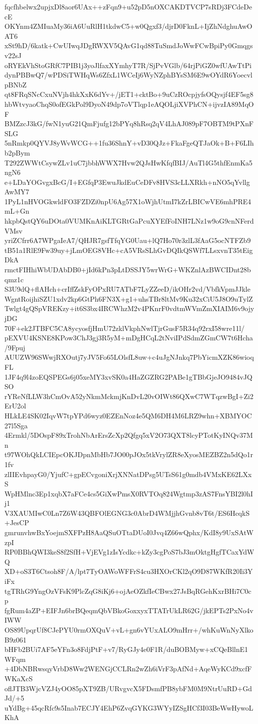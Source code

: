 fqcfhbelwx2upjxDl8aor6UAx++zFqn9+u52pD5nOXCAKDTVCP7sRDj3FCdeDecE
OKYnm4ZMIuaMy36iA6UuRlH1tkdwC5+w0Qgxf3/djrD0FknL+IjZhNdghuAwOAT6
xSt9hD/6katk+CwUIwqJDgRWXV5QAvG1qd88TuSmdJoWwFCwBpiPy0Gmqgsv22sJ
oRYEkVhStoGRfC7PIB1j3yoJlfaxXYmhyT7R/SjPvVGlb/64rjPiGZ0wfUAwTtPi
dynPBBwQ7/wPDSiTWHqWs6ZfxL1WCeIj6WyNZphBYsSM6E9wOYdR6YoecvlpBNbZ
qt8FRqSNcCxuNVjh4hkXxK6dYv+/jET1+cktBo+9uCzROcpjyfsOQysjf4EF5sg8
hbWtvyaoChqS0ofEGkPol9DyoN49dp7oVTlqp1eAQOLjiXVPhCN+ijvzIA89MqOF
BMZzcJ3kG/fwN1yuG21QmFjufg12bPYq8hRsq2qV4LhAJ089pF7OBTM9tPXnFSLG
5nRmkp0QYVJ8yWvWCG++1fu36ShnY+vD30QJz+FkaFgeQTJaOk+B+F6LIhb2pBym
T292ZWWtCsywZLv1uC7jbbhWWX7Hvw2QJsHwKfqfBIJ/AuTl4G5thfEnmKa5ngN6
e+LDaYOGvgxBcG/I+EGfqP3EwuJkdEuCeDFv8HVS3cLLXRkh+nNO5qYvllgAwMY7
1PyL1nHVOGkwldFO3FZDZi0npU6Ag57X1oWjhUtmI7kZrLBICwVE6mhPRE4mL+Gn
hkpbQstQY6uDOta0VUMKnAiKLTGRtGaPcuXYEfFoINH7LNz1w9oG9cnNFerdVMsv
yriZCfrr6A7WPgaIeA7/QHJR7gsfTfqYG0Uau+lQ7Ho70r3zlL3fAaG5ocNTFZb9
tB51a1RlE9Fw39uy+jLmOEG8VHc+cA5VRsSLhGvDQIkQSWf7LLsxvnT35tEigDkA
rmctFIHhiWbUDAbDB0+jId6kPn3pLtDSSJY5wrWrG+WKZnlAzBWCIDnt28bqmz1c
S3U9dQ+flAHch+crIffZskFyOPxRU7ATbF7LyZZeeD/ikOHr2vd/VbfkVpmJJkle
WgntRoijhiSZU1xdv2kp6GtPh6FN3X+g1+uhsTBr8ltMv9Ku32xCiU5J8O9uTylZ
Twlgt4gQSpVREKzy+it6S3bx4IRCWhzM2v4PKnrF0vdtmWVmZmXIAIM6v9ojyjDG
70F+ek2JTBFC5CA8ycyosfjHmU72zklVkphNwlTjrGusF5R34q92rxI58wre11l/
pEXVU4KSNE8KPow3ChJ3gj3R5yM+mDgHCqL2tNviIPdSdmZGmCW7t6Hcha/9Fpuj
AUUZW96SWwjRXOutj7yJV5Fo65LOlsfL8uw+c4uJgNJnkq7PbYicmXZK86wioqFL
1JF4q9l4zoEQSPEGs6j05xeMY3xvSK0a4HaZGZRG2PABe1gTBbGjeJO9484vJQSO
rYReNfLLW3hCmOvA52yNkmMckmjKnDvL20vOIWt86QXwC7WTqzwBgI+Zi2ErU2ol
HLkLE4SK02IqvW7tpYPd6wyz0EZEnNoz4e5QM6DH4M6LRZ9whn+XBMYOC27l5Sga
4Ermkl/5DOspF89xTrohNbArErsZcXp2Qfgq5xV2O73QXT8lcyPTotKyINQv37Mn
t97WOhQkLCIEpcOKJDpnMbHb7JO00pJOx5tkVrylZR8eXyosMEZBZ2n5dQo1r1fv
zlIIEvhpayG0/YjufC+gpECvgoniXrjXNNatDPsg5UTsS61g0mdb4VMxKE62LXxS
WpHMlnc3Ep1xqbX7aFCe4cs5GiXwPmsX0RVTOq824Wgtmp3zAS7FnsYBI2l0hIj1
V3XAUMIwC0Ln7Z6W43QBFOlEGNG3c0AbrD4WMjjhGvnb8vT6t/ES6HcqkS+JesCP
gmrunvhwBxYoejmSXFPzH8AaQSuOTtaDUoI0Jvq4Z66wQphx/KdI8y9UxSAtWzpI
RP0BBhQWI3keS8f2SfH+VjEVg1zIsYcdkc+kZy3cgPoS7bJ3mOktgHgfTCaxYdWQ
XD+oS3T6Ctsoh8F/A/lpt7TyOAWoWFFrS4cu3HXOrCKl2qO9D87WKfR20Ii3YiFx
tgTRhG9YngOzVFsK9PlcZqG8iKj6+ojAeOZkfIeCBwx27JsBqRGehKxrBHi7C0cp
fgRum4aZP+EIFJn6brBQeqmQbVBkoGoxxyxTTATrUkLR62G/jkEPTs2PxNo4vIWW
OS89UpqrUf8CJePYU0rmOXQuV+vL+gn6vYUxALO9mHrr+/whKuWnNyXlkoB9z061
bHFb2BUi7AF5eYFn3o8FdjPtF+v7/RyGJy4e0F1R/duBOBMyw+xCQeBllnE1WFqm
+4DbNBRwsqyVrbD8Ww2WENGjCCLRn2wZh6iVrF3pAfNd+AqeWyKCd9xcfFWKaXcS
oflJTB3WjcVZJ4yOO85pXT9ZB/URvgvcX5FDsmfPB8ybFM0M9NtrUuRD+GdJd/+5
uYdBg+45qcRfc9s5Inab7ECJY4EhP6ZvqGYKG3WYyIZSgHCf3I03BeWwHywoLKhA
